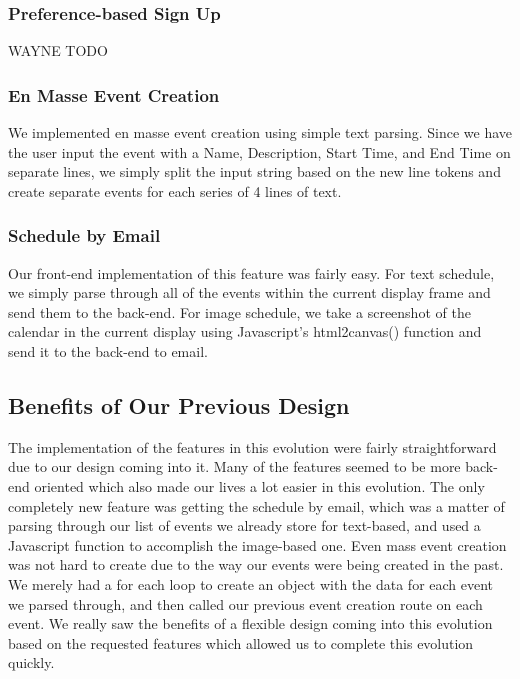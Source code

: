 \documentclass[11pt]{article}   %
\begin{document}
\subsubsection{Preference-based Sign Up}
{\color{red} WAYNE TODO }

\subsubsection{En Masse Event Creation}

We implemented en masse event creation using simple text parsing. Since we have the user input the event with a Name, Description, Start Time, and End Time on separate lines, we simply split the input string based on the new line tokens and create separate events for each series of 4 lines of text.

\subsubsection{Schedule by Email}
Our front-end implementation of this feature was fairly easy. For text schedule, we simply parse through all of the events within the current display frame and send them to the back-end. For image schedule, we take a screenshot of the calendar in the current display using Javascript's html2canvas() function and send it to the back-end to email.

\subsection{Benefits of Our Previous Design}

The implementation of the features in this evolution were fairly straightforward due to our design coming into it. Many of the features seemed to be more back-end oriented which also made our lives a lot easier in this evolution. The only completely new feature was getting the schedule by email, which was a matter of parsing through our list of events we already store for text-based, and used a Javascript function to accomplish the image-based one. Even mass event creation was not hard to create due to the way our events were being created in the past. We merely had a for each loop to create an object with the data for each event we parsed through, and then called our previous event creation route on each event. We really saw the benefits of a flexible design coming into this evolution based on the requested features which allowed us to complete this evolution quickly.
\end{document}
